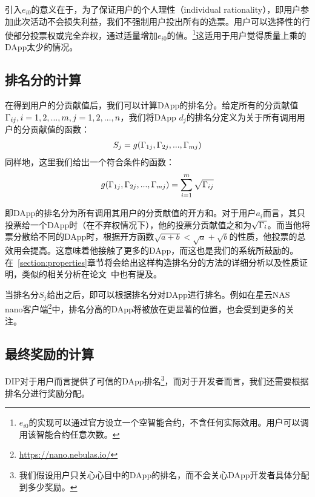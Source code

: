 引入$e_{i0}$的意义在于，为了保证用户的个人理性（individual rationality），即用户参加此次活动不会损失利益，我们不强制用户投出所有的选票。用户可以选择性的行使部分投票权或完全弃权，通过适量增加$e_{i0}$的值。\footnote{$e_{i0}$的实现可以通过官方设立一个空智能合约，不含任何实际效用。用户可以调用该智能合约任意次数。}这适用于用户觉得质量上乘的DApp太少的情况。


\subsection{排名分的计算}
在得到用户的分贡献值后，我们可以计算DApp的排名分。给定所有的分贡献值$\Gamma_{ij}, i=1,2,...,m,j=1,2,...,n$，我们将DApp $d_j$的排名分定义为关于所有调用用户的分贡献值的函数：
\begin{align}
S_j = g(\Gamma_{1j},\Gamma_{2j},...,\Gamma_{mj})
\end{align}
同样地，这里我们给出一个符合条件的函数：
\begin{align}
\label{eq:sqrt}
g(\Gamma_{1j},\Gamma_{2j},...,\Gamma_{mj}) = \sum_{i=1}^m \sqrt{\Gamma_{ij}}
\end{align}

即DApp的排名分为所有调用其用户的分贡献值的开方和。对于用户$a_i$而言，其只投票给一个DApp时（在不弃权情况下），他的投票分贡献值之和为$\sqrt{\Gamma_i}$。而当他将票分散给不同的DApp时，根据开方函数$\sqrt{a+b}<\sqrt{a}+\sqrt{b}$的性质，他投票的总效用会提高。这意味着他接触了更多的DApp，而这也是我们的系统所鼓励的。在~\ref{section:properties}章节将会给出这样构造排名分的方法的详细分析以及性质证明，类似的相关分析在论文~\cite{buterin2018liberal}中也有提及。


当排名分$S_j$给出之后，即可以根据排名分对DApp进行排名。例如在星云NAS nano客户端\footnote{\url{https://nano.nebulas.io/}}中，排名分高的DApp将被放在更显著的位置，也会受到更多的关注。


\subsection{最终奖励的计算}
DIP对于用户而言提供了可信的DApp排名\footnote{我们假设用户只关心心目中的DApp的排名，而不会关心DApp开发者具体分配到多少奖励。}，而对于开发者而言，我们还需要根据排名分进行奖励分配。

